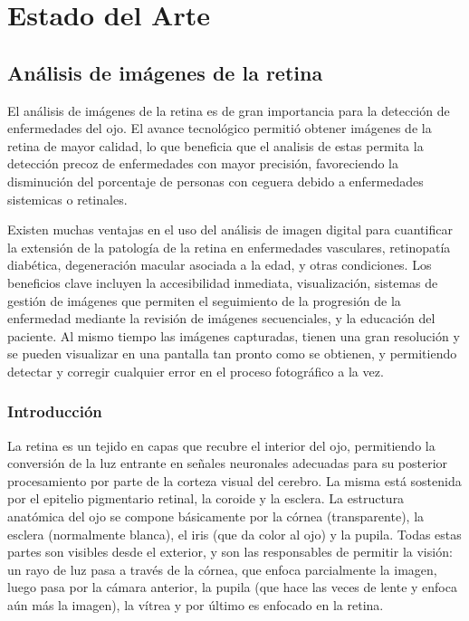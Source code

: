 \chapter{Estado del Arte} %

\label{Chapter2} %


\section{An\'alisis de im\'agenes de la retina}

El an\'alisis de im\'agenes de la retina es de gran importancia para la detecci\'on de enfermedades del ojo.
El avance tecnol\'ogico permiti\'o obtener im\'agenes de la retina de mayor calidad, lo que beneficia que el analisis de estas permita la detecci\'on precoz de enfermedades con mayor precisi\'on, favoreciendo la disminuci\'on del porcentaje de personas con ceguera debido a enfermedades sistemicas o retinales. 

Existen muchas ventajas en el uso del an\'alisis de imagen digital para cuantificar la extensi\'on de la patolog\'ia de la retina en enfermedades vasculares, retinopat\'ia diab\'etica, degeneraci\'on macular asociada a la edad, y otras condiciones. Los beneficios clave incluyen la accesibilidad inmediata, visualizaci\'on, sistemas de gesti\'on de im\'agenes que permiten el seguimiento de la progresi\'on de la enfermedad mediante la revisi\'on de im\'agenes secuenciales, y la educaci\'on del paciente. Al mismo tiempo las im\'agenes capturadas, tienen una  gran resoluci\'on y se pueden visualizar en una pantalla tan pronto como se obtienen, y  permitiendo detectar y corregir cualquier error en el proceso fotogr\'afico a la vez. \cite{cunha2004blood}


\subsection{Introducci\'on}

La retina es un tejido en capas que recubre el interior del ojo, permitiendo la conversión de la luz entrante en señales neuronales adecuadas para su posterior procesamiento por parte de la corteza visual del cerebro. La misma está sostenida por el epitelio pigmentario retinal, la coroide y la esclera.
La estructura anatómica del ojo se compone básicamente por la córnea (transparente), la esclera (normalmente blanca), el iris (que da color al ojo) y la pupila. Todas estas partes son visibles desde el exterior, y son las responsables de permitir la visión: un rayo de luz pasa a través de la córnea, que enfoca parcialmente la imagen, luego pasa por la cámara anterior, la pupila (que hace las veces de lente y enfoca aún más la imagen), la vítrea y por último es enfocado en la retina.

